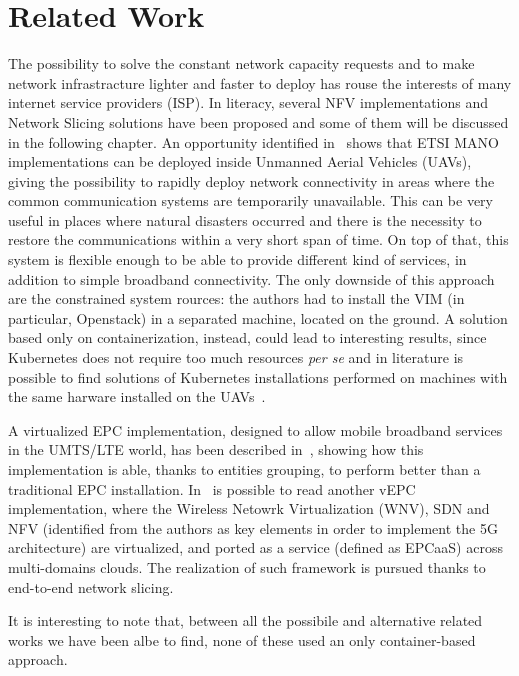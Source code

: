 \chapter{Related Work}
\label{chap:rel_wk}

The possibility to solve the constant network capacity requests and to make
network infrastracture lighter and faster to deploy has rouse the interests of
many internet service providers (ISP). In literacy, several NFV implementations
and Network Slicing solutions have been proposed and some of them will be
discussed in the following chapter. An opportunity identified
in~\cite{nogales2018nfv} shows that ETSI MANO implementations can be deployed
inside Unmanned Aerial Vehicles (UAVs), giving the possibility to rapidly deploy
network connectivity in areas where the common communication systems are
temporarily unavailable. This can be very useful in places where natural
disasters occurred and there is the necessity to restore the communications
within a very short span of time. On top of that, this system is flexible enough
to be able to provide different kind of services, in addition to simple
broadband connectivity. The only downside of this approach are the constrained
system rources: the authors had to install the VIM (in particular, Openstack) in
a separated machine, located on the ground. A solution based only on
containerization, instead, could lead to interesting results, since Kubernetes
does not require too much resources \textit{per se} and in literature is
possible to find solutions of Kubernetes installations performed on machines
with the same harware installed on the UAVs~\cite{pahl2016container}.

A virtualized EPC implementation, designed to allow mobile broadband services in
the UMTS/LTE world, has been described in~\cite{hawilo2014nfv}, showing how this
implementation is able, thanks to entities grouping, to perform better than a
traditional EPC installation. In~\cite{afolabi2017end} is possible to read
another vEPC implementation, where the Wireless Netowrk Virtualization (WNV),
SDN and NFV (identified from the authors as key elements in order to implement
the 5G architecture) are virtualized, and ported as a service (defined as
EPCaaS) across multi-domains clouds. The realization of such framework is
pursued thanks to end-to-end network slicing.



It is interesting to note that, between all the possibile and alternative
related works we have been albe to find, none of these used an only
container-based approach.
